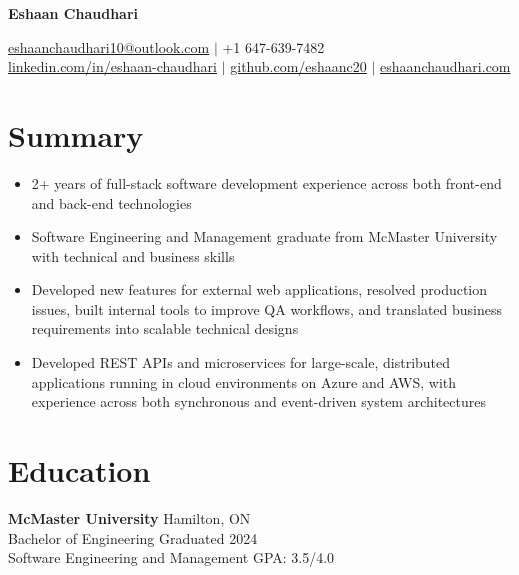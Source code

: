 \documentclass[a4paper,10pt]{article}
\begin{document}
\begin{center}
    {\huge \textbf{Eshaan Chaudhari}}

    \vspace{0.3em}

    \raisebox{-0.05em}{\faEnvelope}\hspace{0.5em}\href{mailto:eshaanchaudhari10@outlook.com}{eshaanchaudhari10@outlook.com} \quad
    $\vert$ \quad
    \raisebox{0.01em}{\faPhone}\hspace{0.5em}\textnormal{+1 647-639-7482} \\[0.25em]

    \raisebox{0.01em}{\faLinkedin}\hspace{0.5em}\href{https://linkedin.com/in/eshaan-chaudhari}{linkedin.com/in/eshaan-chaudhari} \quad
    $\vert$ \quad
    \raisebox{0em}{\faGithub}\hspace{0.5em}\href{https://github.com/eshaanc20}{github.com/eshaanc20} \quad
    $\vert$ \quad
    \raisebox{0em}{\faGlobe}\hspace{0.5em}\href{https://eshaanchaudhari.com}{eshaanchaudhari.com}
\end{center}

\vspace{0.3em}

\section*{Summary}
\begin{itemize}
    \item 2+ years of full-stack software development experience across both front-end and back-end technologies
    \item Software Engineering and Management graduate from McMaster University with technical and business skills
    \item Developed new features for external web applications, resolved production issues, built internal tools to improve QA workflows, and translated business requirements into scalable technical designs
    \item Developed REST APIs and microservices for large-scale, distributed applications running in cloud environments on Azure and AWS, with experience across both synchronous and event-driven system architectures
\end{itemize}

\vspace{0.2em}

\section*{Education}
\textbf{McMaster University} \hfill Hamilton, ON \\
Bachelor of Engineering \hfill Graduated 2024 \\
Software Engineering and Management \hfill GPA: 3.5/4.0
\end{document}
